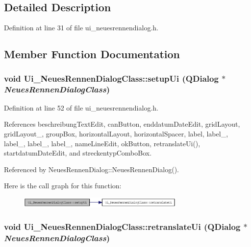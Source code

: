 \subsection{Detailed Description}


Definition at line 31 of file ui\_\-neuesrennendialog.h.

\subsection{Member Function Documentation}
\hypertarget{class_ui___neues_rennen_dialog_class_82bf9054e4760ff6638ded1c7e59df8a}{
\subsubsection[setupUi]{\setlength{\rightskip}{0pt plus 5cm}void Ui\_\-NeuesRennenDialogClass::setupUi (QDialog $\ast$ {\em NeuesRennenDialogClass})}}
\label{class_ui___neues_rennen_dialog_class_82bf9054e4760ff6638ded1c7e59df8a}




Definition at line 52 of file ui\_\-neuesrennendialog.h.

References beschreibungTextEdit, canButton, enddatumDateEdit, gridLayout, gridLayout\_, groupBox, horizontalLayout, horizontalSpacer, label, label\_, label\_, label\_, label\_, nameLineEdit, okButton, retranslateUi(), startdatumDateEdit, and streckentypComboBox.

Referenced by NeuesRennenDialog::NeuesRennenDialog().

Here is the call graph for this function:\nopagebreak
\begin{figure}[H]
\begin{center}
\leavevmode
\includegraphics[width=233pt]{class_ui___neues_rennen_dialog_class_82bf9054e4760ff6638ded1c7e59df8a_cgraph}
\end{center}
\end{figure}
\hypertarget{class_ui___neues_rennen_dialog_class_c02fd0511765e9d5090ae696abc74f60}{
\subsubsection[retranslateUi]{\setlength{\rightskip}{0pt plus 5cm}void Ui\_\-NeuesRennenDialogClass::retranslateUi (QDialog $\ast$ {\em NeuesRennenDialogClass})}}
\label{class_ui___neues_rennen_dialog_class_c02fd0511765e9d5090ae696abc74f60}




